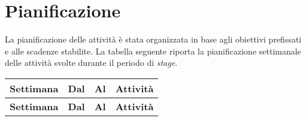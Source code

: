 \section{Pianificazione}

La pianificazione delle attività è stata organizzata in base agli obiettivi prefissati e alle scadenze stabilite. La tabella seguente riporta la pianificazione settimanale delle attività svolte durante il periodo di \emph{stage}.

\begin{longtable}{|c|c|c|p{8cm}|}
    \hline
    \textbf{Settimana} & \textbf{Dal} & \textbf{Al} & \textbf{Attività}                                          \\
    \hline
    \endfirsthead

    \hline
    \textbf{Settimana} & \textbf{Dal} & \textbf{Al} & \textbf{Attività}                                          \\
    \hline
    \endhead


\end{longtable}
